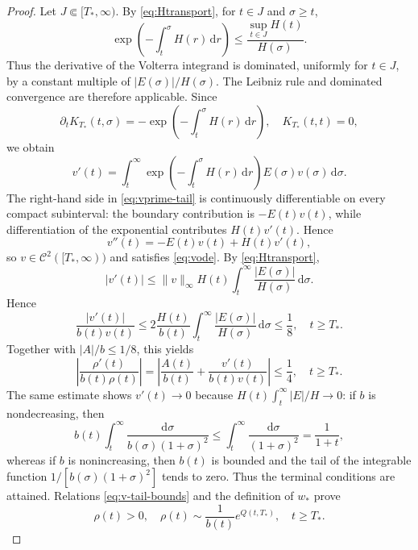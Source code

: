 \documentclass[11pt,reqno]{amsart}
\theoremstyle{definition}
\theoremstyle{remark}
\begin{document}
\begin{proof}
		Let $J\Subset[T_*,\infty)$. By \eqref{eq:Htransport}, for $t\in J$ and $\sigma\geq t$,
		$$
		\exp\left(-\int_t^\sigma H(r)\,\mathrm d r\right)
		\leq
		\frac{\sup_{t\in J}H(t)}{H(\sigma)}.
		$$
		Thus the derivative of the Volterra integrand is dominated, uniformly for $t\in J$, by a constant multiple of $|E(\sigma)|/H(\sigma)$. The Leibniz rule and dominated convergence are therefore applicable. Since
		$$
		\partial_tK_{T_*}(t,\sigma)
		=-\exp\left(-\int_t^\sigma H(r)\,\mathrm{d}r\right),
		\quad K_{T_*}(t,t)=0,
		$$
		we obtain
		\begin{equation}
			\label{eq:vprime-tail}
			v'(t)=\int_t^\infty
			\exp\left(-\int_t^\sigma H(r)\,\mathrm{d}r\right)
			E(\sigma)v(\sigma)\,\mathrm{d}\sigma.
		\end{equation}
		The right-hand side in \eqref{eq:vprime-tail} is continuously differentiable on every compact subinterval: the boundary contribution is $-E(t)v(t)$, while differentiation of the exponential contributes $H(t)v'(t)$. Hence
		$$
		v''(t)=-E(t)v(t)+H(t)v'(t),
		$$
		so $v\in \mathcal{C}^2([T_*,\infty))$ and satisfies \eqref{eq:vode}. By \eqref{eq:Htransport},
		$$
		|v'(t)|
		\leq\|v\|_\infty H(t)
		\int_t^\infty\frac{|E(\sigma)|}{H(\sigma)}\,\mathrm{d}\sigma.
		$$
		Hence
		$$
		\frac{|v'(t)|}{b(t)v(t)}
		\leq2\frac{H(t)}{b(t)}
		\int_t^\infty\frac{|E(\sigma)|}{H(\sigma)}\,\mathrm{d}\sigma
		\leq\frac18,
		\quad t\geq T_*.
		$$
		Together with $|A|/b\leq1/8$, this yields
		$$
		\left|\frac{\rho'(t)}{b(t)\rho(t)}\right|
		=\left|\frac{A(t)}{b(t)}+\frac{v'(t)}{b(t)v(t)}\right|
		\leq\frac14,
		\quad t\geq T_*.
		$$
		The same estimate shows $v'(t)\to0$ because $H(t)\int_t^\infty |E|/H\to0$: if $b$ is nondecreasing, then
		$$
		b(t)\int_t^\infty\frac{\mathrm{d}\sigma}{b(\sigma)(1+\sigma)^2}
		\leq\int_t^\infty\frac{\mathrm{d}\sigma}{(1+\sigma)^2}
		=\frac{1}{1+t},
		$$
		whereas if $b$ is nonincreasing, then $b(t)$ is bounded and the tail of the integrable function $1/[b(\sigma)(1+\sigma)^2]$ tends to zero. Thus the terminal conditions are attained. Relations \eqref{eq:v-tail-bounds} and the definition of $w_*$ prove
		$$
		\rho(t)>0,
		\quad
		\rho(t)\sim\frac{1}{b(t)}e^{Q(t,T_*)},
		\quad t\geq T_*.
		$$
		

\end{proof}
\end{document}
